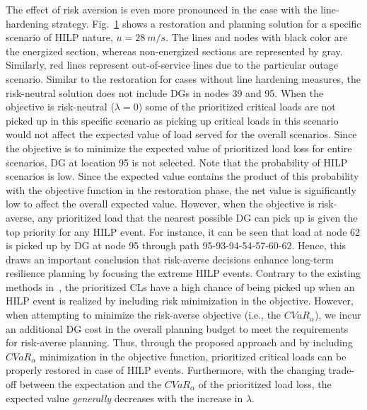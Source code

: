 The effect of risk aversion is even more pronounced in the case with the line-hardening strategy. Fig.~\ref{fig:neutral_vs_averse_harden} shows a restoration and planning solution for a specific scenario of HILP nature, $u = 28~m/s$. The lines and nodes with black color are the energized section, whereas non-energized sections are represented by gray. Similarly, red lines represent out-of-service lines due to the particular outage scenario.
Similar to the restoration for cases without line hardening measures, the risk-neutral solution does not include DGs in nodes 39 and 95. When the objective is risk-neutral ($\lambda=0$) some of the prioritized critical loads are not picked up in this specific scenario as picking up critical loads in this scenario would not affect the expected value of load served for the overall scenarios. Since the objective is to minimize the expected value of prioritized load loss for entire scenarios, DG at location 95 is not selected. Note that the probability of HILP scenarios is low. Since the expected value contains the product of this probability with the objective function in the restoration phase, the net value is significantly low to affect the overall expected value. However, when the objective is risk-averse, any prioritized load that the nearest possible DG can pick up is given the top priority for any HILP event. For instance, it can be seen that load at node 62 is picked up by DG at node 95 through path 95-93-94-54-57-60-62.
Hence, this draws an important conclusion that risk-averse decisions enhance long-term resilience planning by focusing the extreme HILP events. Contrary to the existing methods in~\cite{8329529, 2021IASTATE, 9136725}, the prioritized CLs have a high chance of being picked up when an HILP event is realized by including risk minimization in the objective. However, when attempting to minimize the risk-averse objective (i.e., the $CVaR_\alpha$), we incur an additional DG cost in the overall planning budget to meet the requirements for risk-averse planning. Thus, through the proposed approach and by including $CVaR_\alpha$ minimization in the objective function, prioritized critical loads can be properly restored in case of HILP events. Furthermore, with the changing trade-off between the expectation and the $CVaR_\alpha$ of the prioritized load loss, the expected value \textit{generally} decreases with the increase in $\lambda$. 

\begin{figure}[ht]
        \centering
        {
    }\hfill
    {
     }
    \caption{}
    \label{fig:neutral_vs_averse_harden}
\end{figure}

